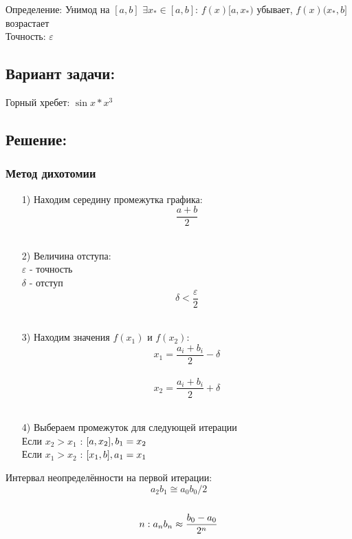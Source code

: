 \documentclass[fleqn]{article}
\begin{document}
Определение: Унимод на $[a, b]$  $ \exists x_* \in [a, b]$:  $f(x) [a,x_*)$ убывает, $f(x) (x_*, b]$  возрастает\\

Точность: $\varepsilon$

\subsection*{Вариант задачи:}
Горный хребет: $\sin{x}*x^3$

\subsection*{Решение:}
\subsubsection{Метод дихотомии}

\begin{itemize}
    \item[1)] Находим середину промежутка графика:\\
    $$\frac{a+b}{2}$$\\
    
    \item[2)] Величина отступа:\\
    $\varepsilon$ - точность\\
    $\delta$ - отступ\\
    $$\delta < \frac{\varepsilon}{2} $$\\
    
    \item[3)] Находим значения $f(x_1)$ и $f(x_2)$:\\
    $$x_1 = \frac{a_i+b_i}{2} - \delta$$\\
    $$x_2 = \frac{a_i+b_i}{2}+\delta$$\\
    
    \item[4)] Выбераем промежуток для следующей итерации\\
    Если $x_2>x_1$ : $[a, x_2],\space b_1=x_2$\\
    Если $x_1>x_2$ : $[x_1, b],\space a_1=x_1$\\
\end{itemize}

Интервал неопределённости на первой итерации:\\
$$a_2b_1 \cong a_0b_0/2$$\\
$$n:\space a_nb_n \approx \frac{b_0-a_0}{2^n}$$\\
\end{document}
